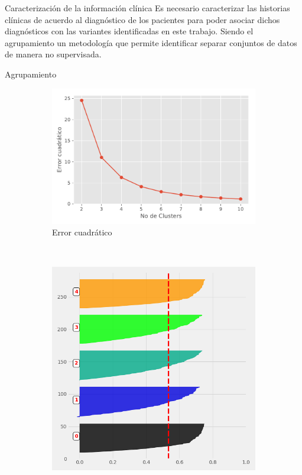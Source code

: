 \documentclass[xcolor=dvipsnames]{beamer}
\begin{document}
\begin{frame}{Caracterización de la información clínica}
\justifying
Es necesario caracterizar las historias clínicas de acuerdo al diagnóstico de los pacientes para poder asociar dichos diagnósticos con las variantes identificadas en este trabajo. Siendo el agrupamiento un metodología que permite identificar separar
conjuntos de datos de manera no supervisada.

\end{frame}
\begin{frame}{Agrupamiento}
 \begin{figure}
		\centering
		\begin{subfigure}[b]{0.5\textwidth}
			\includegraphics[width=\textwidth]{Clusters.pdf}
			\caption{Error cuadrático}
		\end{subfigure}
		~ %
		\begin{subfigure}[b]{0.35\textwidth}
			\includegraphics[width=\textwidth]{S.png}

\end{subfigure}
\end{figure}
\end{frame}
\end{document}
